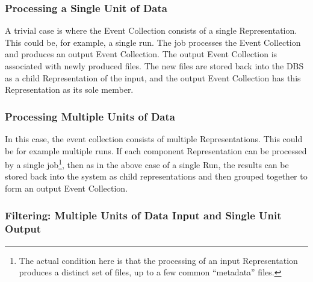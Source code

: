 \documentclass{cmspaper}
\begin{document}
\subsubsection{Processing a Single Unit of Data}

A trivial case is where the Event Collection consists of a single Representation. 
This could be, for example, a single run.  The job processes the Event Collection 
and produces an output Event Collection.  The output Event Collection is associated 
with newly produced files.  The new files are stored back into the DBS as a child 
Representation of the input,  and the output Event Collection has this Representation 
as its sole member. 

\subsubsection{Processing Multiple Units of Data}

In this case, the event collection consists of multiple Representations. This 
could be for example multiple runs.  If each component Representation can be 
processed by a single job\footnote{The actual condition here is that the processing 
of an input Representation produces a distinct set of files, up to a few common ``metadata'' 
files.}, then as in the above case of a single Run, the results
can be stored back into the system as child representations and then grouped
together to form an output Event Collection.  

\subsubsection{Filtering: Multiple Units of Data Input and Single Unit Output}
\end{document}
